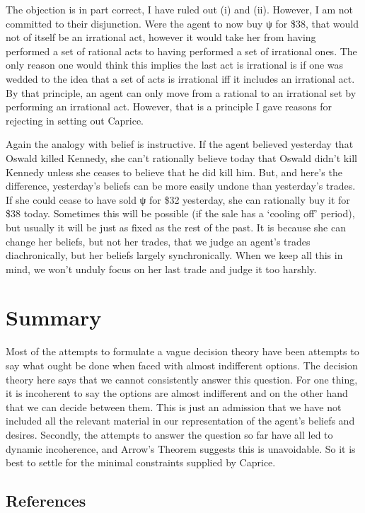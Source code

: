 \documentclass[
  10pt,
  letterpaper,
  DIV=11,
  numbers=noendperiod,
  twoside]{scrartcl}
\begin{document}
The objection is in part correct, I have ruled out (i) and (ii).
However, I am not committed to their disjunction. Were the agent to now
buy ψ for \$38, that would not of itself be an irrational act, however
it would take her from having performed a set of rational acts to having
performed a set of irrational ones. The only reason one would think this
implies the last act is irrational is if one was wedded to the idea that
a set of acts is irrational iff it includes an irrational act. By that
principle, an agent can only move from a rational to an irrational set
by performing an irrational act. However, that is a principle I gave
reasons for rejecting in setting out Caprice.

Again the analogy with belief is instructive. If the agent believed
yesterday that Oswald killed Kennedy, she can't rationally believe today
that Oswald didn't kill Kennedy unless she ceases to believe that he did
kill him. But, and here's the difference, yesterday's beliefs can be
more easily undone than yesterday's trades. If she could cease to have
sold ψ for \$32 yesterday, she can rationally buy it for \$38 today.
Sometimes this will be possible (if the sale has a `cooling off'
period), but usually it will be just as fixed as the rest of the past.
It is because she can change her beliefs, but not her trades, that we
judge an agent's trades diachronically, but her beliefs largely
synchronically. When we keep all this in mind, we won't unduly focus on
her last trade and judge it too harshly.

\section{Summary}\label{summary}

Most of the attempts to formulate a vague decision theory have been
attempts to say what ought be done when faced with almost indifferent
options. The decision theory here says that we cannot consistently
answer this question. For one thing, it is incoherent to say the options
are almost indifferent and on the other hand that we can decide between
them. This is just an admission that we have not included all the
relevant material in our representation of the agent's beliefs and
desires. Secondly, the attempts to answer the question so far have all
led to dynamic incoherence, and Arrow's Theorem suggests this is
unavoidable. So it is best to settle for the minimal constraints
supplied by Caprice.

\subsection*{References}\label{references}
\end{document}

